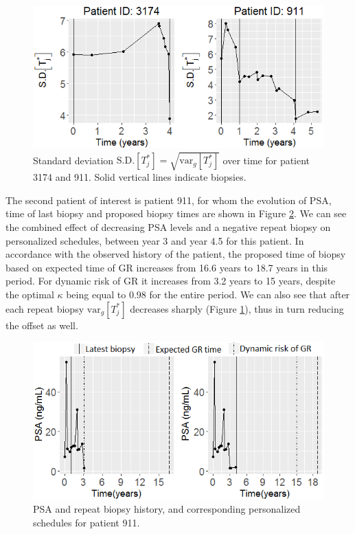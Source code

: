 \begin{figure}
\centerline{\includegraphics[width=\columnwidth]{images/prias_demo/variance_3174_911.png}}
\caption{Standard deviation $\mbox{S.D.}[T^*_j] = \sqrt{\mbox{var}_g[T^*_j]}$ over time for patient 3174 and 911. Solid vertical lines indicate biopsies.}
\label{fig : variance_pred_dist_3174_911}
\end{figure}

The second patient of interest is patient 911, for whom the evolution of PSA, time of last biopsy and proposed biopsy times are shown in Figure \ref{fig : prias_demo_pid_911}. We can see the combined effect of decreasing PSA levels and a negative repeat biopsy on personalized schedules, between year 3 and year 4.5 for this patient. In accordance with the observed history of the patient, the proposed time of biopsy based on expected time of GR increases from 16.6 years to 18.7 years in this period. For dynamic risk of GR it increases from 3.2 years to 15 years, despite the optimal $\kappa$ being equal to 0.98 for the entire period. We can also see that after each repeat biopsy $\mbox{var}_g[T^*_j]$ decreases sharply (Figure \ref{fig : variance_pred_dist_3174_911}), thus in turn reducing the offset as well.

\begin{figure}
\centerline{
\includegraphics[width=\columnwidth]{images/prias_demo/case_911.png}
}
\caption{PSA and repeat biopsy history, and corresponding personalized schedules for patient 911.}
\label{fig : prias_demo_pid_911}
\end{figure}

